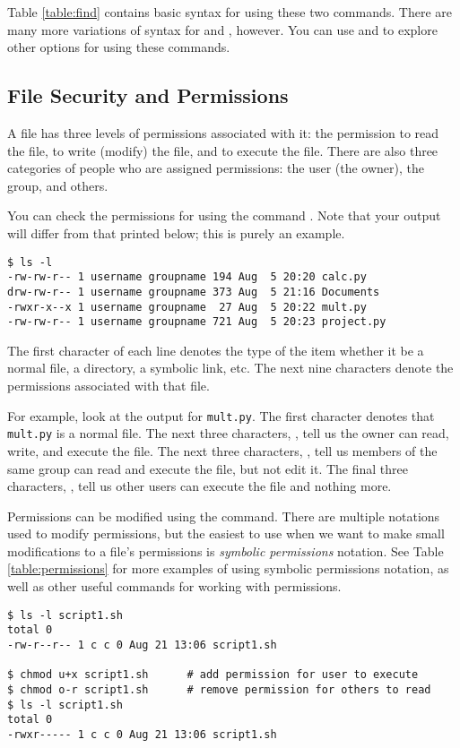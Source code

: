Table \ref{table:find} contains basic syntax for using these two commands.
There are many more variations of syntax for  and , however.
You can use  and  to explore other options for using these commands.


\subsection*{File Security and Permissions}%
A file has three levels of permissions associated with it: the permission to read the file, to write (modify) the file, and to execute the file.
There are also three categories of people who are assigned permissions: the user (the owner), the group, and others.

You can check the permissions for  using the command .
Note that your output will differ from that printed below; this is purely an example.

\begin{lstlisting}
$ ls -l
-rw-rw-r-- 1 username groupname 194 Aug  5 20:20 calc.py
drw-rw-r-- 1 username groupname 373 Aug  5 21:16 Documents
-rwxr-x--x 1 username groupname  27 Aug  5 20:22 mult.py
-rw-rw-r-- 1 username groupname 721 Aug  5 20:23 project.py
\end{lstlisting}

The first character of each line denotes the type of the item whether it be a normal file, a directory, a symbolic link, etc.
The next nine characters denote the permissions associated with that file.

For example, look at the output for \texttt{mult.py}.
The first character \li{-} denotes that \texttt{mult.py} is a normal file.
The next three characters, , tell us the owner can read, write, and execute the file.
The next three characters, , tell us members of the same group can read and execute the file, but not edit it.
The final three characters, , tell us other users can execute the file and nothing more.

Permissions can be modified using the  command.
There are multiple notations used to modify permissions, but the easiest to use when we want to make small modifications to a file's permissions is \emph{symbolic permissions} notation.
See Table \ref{table:permissions} for more examples of using symbolic permissions notation, as well as other useful commands for working with permissions.
\begin{lstlisting}
$ ls -l script1.sh
total 0
-rw-r--r-- 1 c c 0 Aug 21 13:06 script1.sh

$ chmod u+x script1.sh      # add permission for user to execute
$ chmod o-r script1.sh 		# remove permission for others to read
$ ls -l script1.sh
total 0
-rwxr----- 1 c c 0 Aug 21 13:06 script1.sh
\end{lstlisting}

